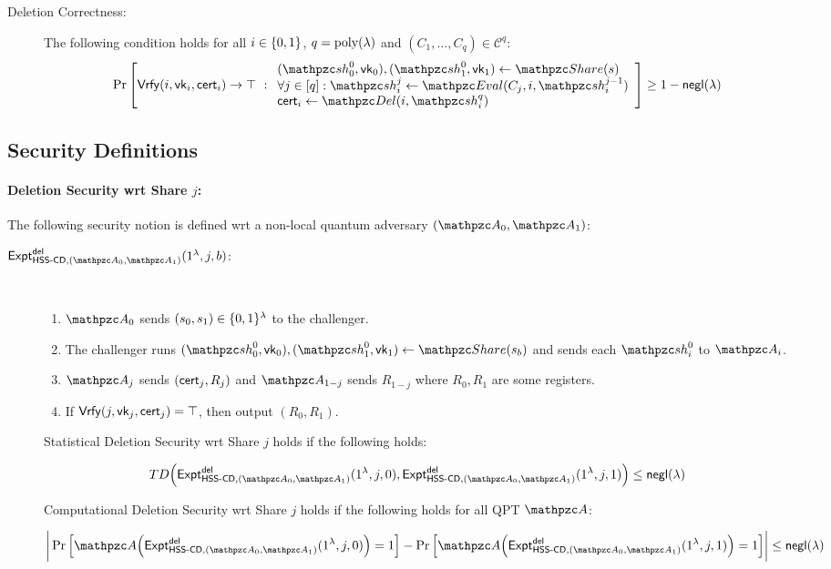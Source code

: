 \begin{description}
\item [Deletion Correctness:] The following condition holds for
all $i \in \{0,1\}$, $q = {\mathrm{poly}}(\lambda)$ and $(C_1, \ldots, C_q) \in
\mathcal{C}^q:$
\begin{align}
\Pr\left[
\Vrfy(i, \vk_i, \cert_i) \rightarrow \top
\ :
\begin{array}{ll}
(\qsh_0^0, \vk_0), (\qsh_1^0, \vk_1) \gets \Sh(s)\\
\forall j \in [q]: \qsh_i^j \leftarrow \Ev(C_j, i,
\qsh_i^{j-1})\\
\cert_i \leftarrow \Del(i, \qsh_i^q)
\end{array}
\right] \geq 1 - \negl(\secp)
\end{align}
\end{description}



\subsection{Security Definitions}
\paragraph{Deletion Security wrt Share $j$:}
The following security notion is defined wrt a non-local quantum
adversary $(\qA_0, \qA_1)$:

\begin{description}
\item [$\expa{\HSScd, (\qA_0, \qA_1)}{del}(1^\secp, j, b)$:] $ $
\begin{enumerate}
\item $\qA_0$ sends $(s_0, s_1) \in \{0,1\}^\lambda$ to the challenger.
\item 
The challenger runs
$(\qsh_0^0, \vk_0), (\qsh_1^0, \vk_1) \gets \Sh(s_b)$ and sends each
$\qsh_i^0$ to $\qA_i$.

\item $\qA_j$ sends $(\mathsf{cert}_j, R_j)$ and $\qA_{1-j}$ sends $R_{1-j}$
where $R_0, R_1$ are some registers.
\item If $\mathsf{Vrfy}(j, \mathsf{vk}_j, \mathsf{cert}_j) = \top$, then output $(R_0, R_1)$.
\end{enumerate}

Statistical Deletion Security wrt Share $j$ holds if the following
holds:

$$TD\Big(\expa{\HSScd, (\qA_0, \qA_1)}{del}(1^\secp, j,
0), \expa{\HSScd, (\qA_0, \qA_1)}{del}(1^\secp, j,
1)\Big) \le \negl(\secp)$$

Computational Deletion Security wrt Share $j$ holds if the following
holds for all QPT $\qA$:

$$\bigg\lvert \Pr\Big[\qA\Big(\expa{\HSScd, (\qA_0,
\qA_1)}{del}(1^\secp, j, 0)\Big)=1\Big] -
\Pr\Big[\qA\Big(\expa{\HSScd, (\qA_0,
\qA_1)}{del}(1^\secp, j, 1)\Big)=1\Big]
\bigg\rvert \le \negl(\secp)$$

\end{description}

